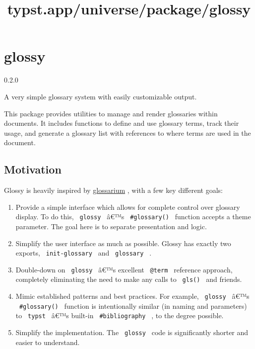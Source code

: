 \title{typst.app/universe/package/glossy}

\label{banner}
\section{glossy}\label{glossy}

{ 0.2.0 }

A very simple glossary system with easily customizable output.

\label{readme}
This package provides utilities to manage and render glossaries within
documents. It includes functions to define and use glossary terms, track
their usage, and generate a glossary list with references to where terms
are used in the document.


\subsection{Motivation}\label{motivation}

Glossy is heavily inspired by
\href{https://typst.app/universe/package/glossarium}{glossarium} , with
a few key different goals:

\begin{enumerate}
\tightlist
\item
  Provide a simple interface which allows for complete control over
  glossary display. To do this, \texttt{\ glossy\ } â€™s
  \texttt{\ \#glossary()\ } function accepts a theme parameter. The goal
  here is to separate presentation and logic.
\item
  Simplify the user interface as much as possible. Glossy has exactly
  two exports, \texttt{\ init-glossary\ } and \texttt{\ glossary\ } .
\item
  Double-down on \texttt{\ glossy\ } â€™s excellent \texttt{\ @term\ }
  reference approach, completely eliminating the need to make any calls
  to \texttt{\ gls()\ } and friends.
\item
  Mimic established patterns and best practices. For example,
  \texttt{\ glossy\ } â€™s \texttt{\ \#glossary()\ } function is
  intentionally similar (in naming and parameters) to \texttt{\ typst\ }
  â€™s built-in \texttt{\ \#bibliography\ } , to the degree possible.
\item
  Simplify the implementation. The \texttt{\ glossy\ } code is
  significantly shorter and easier to understand.
\end{enumerate}

